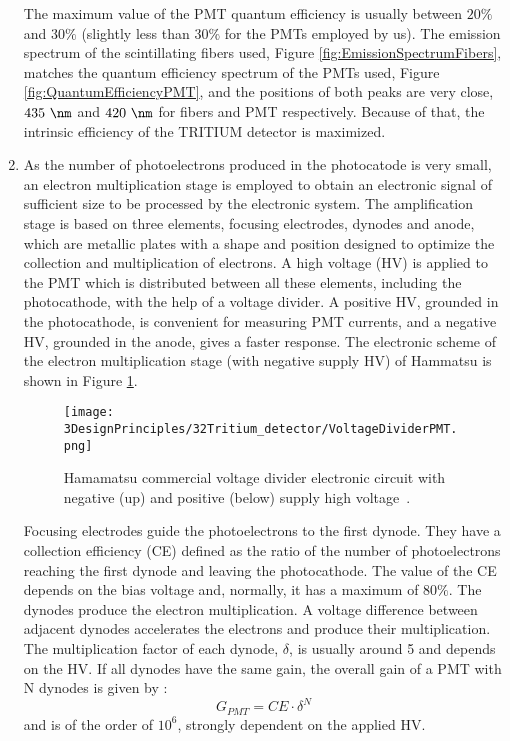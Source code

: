 \begin{enumerate}
The maximum value of the PMT quantum efficiency is usually between $20\%$ and $30\%$ \cite{Knoll} (slightly less than $30\%$ for the PMTs employed by us). The emission spectrum of the scintillating fibers used, Figure \ref{fig:EmissionSpectrumFibers}, matches the quantum efficiency spectrum of the PMTs used, Figure \ref{fig:QuantumEfficiencyPMT}, and the positions of both peaks are very close, $435~\nm$ and $420~\nm$ for fibers and PMT respectively. Because of that, the intrinsic efficiency of the TRITIUM detector is maximized.

\item{} As the number of photoelectrons produced in the photocatode is very small, an electron multiplication stage is employed to obtain an electronic signal of sufficient size to be processed by the electronic system. The amplification stage is based on three elements, focusing electrodes, dynodes and anode, which are metallic plates with a shape and position designed to optimize the collection and multiplication of electrons. A high voltage (HV) is applied to the PMT which is distributed between all these elements, including the photocathode, with the help of a voltage divider. A positive HV, grounded in the photocathode, is convenient for measuring PMT currents, and a negative HV, grounded in the anode, gives a faster response. The electronic scheme of the electron multiplication stage (with negative supply HV) of Hammatsu is shown in Figure \ref{fig:VoltageDividerCircuit}.

\begin{figure}[h]
\centering
\texttt{[image: 3DesignPrinciples/32Tritium\_detector/VoltageDividerPMT.png]}
\caption{Hamamatsu commercial voltage divider electronic circuit with negative (up) and positive (below) supply high voltage\label{fig:VoltageDividerCircuit}~\cite{DataSheetPMTs}.}
\end{figure}


Focusing electrodes guide the photoelectrons to the first dynode. They have a collection efficiency (CE) defined as the ratio of the number of photoelectrons reaching the first dynode and leaving the photocathode. The value of the CE depends on the bias voltage and, normally, it has a maximum of $80\%$. The dynodes produce the electron multiplication. A voltage difference between adjacent dynodes accelerates the electrons and produce their multiplication. The multiplication factor of each dynode, $\delta$, is usually around 5 and depends on the HV. If all dynodes have the same gain, the overall gain of a PMT with N dynodes is given by \cite{Knoll}:
\begin{equation}
G_{PMT} = CE\cdot{} \delta^N
\label{eq:PMTGain}
\end{equation}
and is of the order of $10^6$, strongly dependent on the applied HV.


\end{enumerate}
